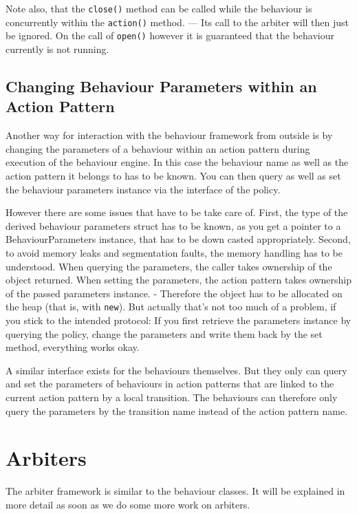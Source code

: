 Note also, that the {\tt close()} method can be called while the behaviour
is concurrently within the {\tt action()} method. --- Its call to the
arbiter will then just be ignored. On the call of {\tt open()} however it
is guaranteed that the behaviour currently is not running.

\subsection{Changing Behaviour Parameters within an Action Pattern}
\label{SEC:DYNAMIC_PARAMETERS}

Another way for interaction with the behaviour framework from outside
is by changing the parameters of a behaviour within an action pattern
during execution of the behaviour engine. In this case the behaviour
name as well as the action pattern it belongs to has to be known. You
can then query as well as set the behaviour parameters instance via
the interface of the policy.

However there are some issues that have to be take care of. First, the
type of the derived behaviour parameters struct has to be known, as
you get a pointer to a BehaviourParameters instance, that has to be
down casted appropriately. Second, to avoid memory leaks and
segmentation faults, the memory handling has to be understood. When
querying the parameters, the caller takes ownership of the object
returned. When setting the parameters, the action pattern takes
ownership of the passed parameters instance. - Therefore the object
has to be allocated on the heap (that is, with {\tt new}). But
actually that's not too much of a problem, if you stick to the
intended protocol: 
If you first retrieve the parameters instance by querying the policy,
change the parameters and write them back by the set method,
everything works okay.

A similar interface exists for the behaviours themselves. But they only
can query and set the parameters of behaviours in action patterns that
are linked to the current action pattern by a local transition. The
behaviours can therefore only query the parameters by the transition
name instead of the action pattern name.

\section{Arbiters}

The arbiter framework is similar to the behaviour classes. It will be
explained in more detail as soon as we do some more work on arbiters.

